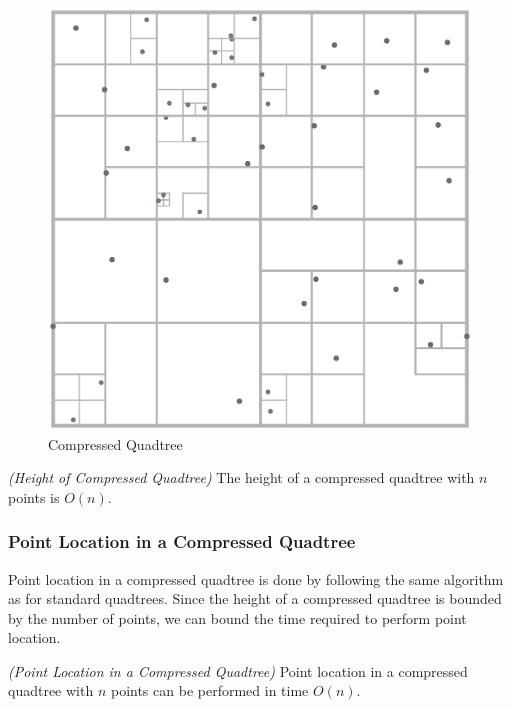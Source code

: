 \documentclass[mcs]{scsthesis}
\begin{document}
\begin{figure}
\begin{center}
\includegraphics[scale=0.35]{diagrams/compressed_quadtree.eps}
\caption{Compressed Quadtree}
\label{fig:compressed_quadtree}
\end{center}
\end{figure}

\begin{thm} \emph{(Height of Compressed Quadtree)}
The height of a compressed quadtree with $n$ points is \(O(n)\).
\end{thm}

\subsubsection{Point Location in a Compressed Quadtree}

Point location in a compressed quadtree is done by following the same algorithm
as for standard quadtrees. Since the height of a compressed quadtree is
bounded by the number of points, we can bound the time required to perform
point location.

\begin{thm} \emph{(Point Location in a Compressed Quadtree)} 
Point location in a compressed quadtree with $n$ points can be performed in
time \(O(n)\). 
\end{thm}
\end{document}
